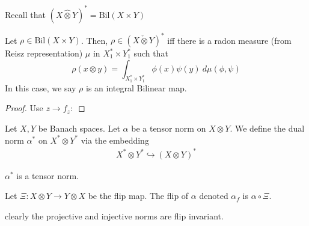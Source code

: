 Recall that $(X \hat{\otimes} Y)^* = \textrm{Bil}(X \times Y)$

\begin{theorem}
  Let $\rho \in \textrm{Bil}(X \times Y)$. Then, $\rho \in (X
  \check{\otimes} Y)^*$ iff there is a radon measure (from Reisz
  representation) $\mu$ in
  $X^*_1 \times Y^*_1$ such that $$\rho(x \otimes y) = \int_{X^*_1 \times
  Y^*_1}  \phi(x) \psi(y) \ d  \mu(\phi, \psi)$$
  In this case, we say $\rho$ is an integral Bilinear map.
\end{theorem}
\begin{proof}
  Use $z \to f_z: $
\end{proof}

\begin{definition}
  Let $X, Y$ be Banach spaces. Let $\alpha$ be a tensor norm on $X
  \otimes Y$. We define the dual norm $\alpha^*$ on $ X^* \otimes Y^*
  $ via the embedding
  \begin{align*}
    X^* \otimes Y^* \hookrightarrow (X \otimes Y)^*
  \end{align*}
\end{definition}

\begin{lemma}
  $\alpha^*$ is a tensor norm.
\end{lemma}

\begin{definition}
  Let $\Xi : X \otimes Y \to Y \otimes X$ be the flip map. The flip
  of $\alpha$ denoted $\alpha_f$ is $\alpha \circ \Xi$.
\end{definition}

clearly the projective and injective norms are flip invariant.

